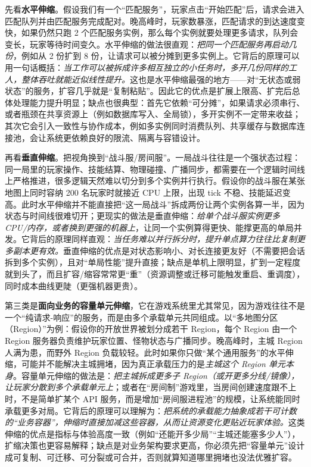 先看\textbf{水平伸缩}。假设我们有一个“匹配服务”，玩家点击“开始匹配”后，请求会进入匹配队列并由匹配服务完成配对。晚高峰时，玩家数暴涨，匹配请求的到达速度变快，如果仍然只跑 2 个匹配服务实例，那么每个实例就要处理更多请求，队列会变长，玩家等待时间变久。水平伸缩的做法很直观：\emph{把同一个匹配服务再启动几份}，例如从 2 份扩到 8 份，让请求可以被分摊到更多实例上。它背后的原理可以用一句话概括：\emph{当工作可以被拆成许多相互独立的小任务时，多开几份同样的工人，整体吞吐就能近似线性提升。}这也是水平伸缩最强的地方——对“无状态或弱状态”的服务，扩容几乎就是“复制粘贴”。因此它的优点是扩展上限高、扩完后总体处理能力提升明显；缺点也很典型：首先它依赖“可分摊”，如果请求必须串行、或者瓶颈在共享资源上（例如数据库写入、全局锁），多开实例不一定带来收益；其次它会引入一致性与协作成本，例如多实例同时消费队列、共享缓存与数据库连接池，会让系统更依赖良好的限流、隔离与容错设计。

再看\textbf{垂直伸缩}。把视角换到“战斗服/房间服”。一局战斗往往是一个强状态过程：同一局里的玩家操作、技能结算、物理碰撞、广播同步，都需要在一个逻辑时间线上严格推进，很多逻辑天然难以切分到多个实例并行执行。假设你的战斗服在某张地图上同时容纳 200 名玩家时就接近 CPU 上限，出现 tick 不稳、技能延迟变高。此时水平伸缩并不能直接把“这一局战斗”拆成两份让两个实例各算一半，因为状态与时间线很难切开；更现实的做法是垂直伸缩：\emph{给单个战斗服实例更多 CPU/内存，或者换到更强的机器上}，让同一个实例算得更快、能撑更高的单局并发。它背后的原理同样直观：\emph{当任务难以并行拆分时，提升单点算力往往比复制更多副本更有效。}垂直伸缩的优点是对状态影响小、对长连接更友好（不需要把会话拆到多个实例），且对“单局性能”提升直接；缺点是单机上限明显，扩到一定程度就到头了，而且扩容/缩容常常更“重”（资源调整或迁移可能触发重启、重调度），同时成本曲线更陡（更强机器更贵）。

第三类是\textbf{面向业务的容量单元伸缩}，它在游戏系统里尤其常见，因为游戏往往不是一个“纯请求-响应”的服务，而是由多个承载单元共同组成。以“多地图分区（Region）”为例：假设你的开放世界被划分成若干 Region，每个 Region 由一个 Region 服务器负责维护玩家位置、怪物状态与广播同步。晚高峰时，主城 Region 人满为患，而野外 Region 负载较轻。此时如果你只做“某个通用服务”的水平伸缩，可能并不能解决主城拥堵，因为真正承载压力的是\emph{主城这个 Region 单元本身}。容量单元伸缩的做法是：\emph{把主城拆成更多子 Region（或开更多分线/镜像），让玩家分散到多个承载单元上}；或者在“房间制”游戏里，当房间创建速度跟不上时，不是简单扩某个 API 服务，而是增加“房间服进程池”的规模，让系统能同时承载更多对局。它背后的原理可以理解为：\emph{把系统的承载能力抽象成若干可计数的“业务容器”，伸缩时直接加减这些容器，从而让资源变化更贴近玩家体验。}这类伸缩的优点是指标与体验高度一致（例如“还能开多少局”“主城还能塞多少人”），扩缩决策也更容易解释；缺点是对业务架构要求更高，你必须先把“容量单元”设计成可复制、可迁移、可分裂或可合并，否则就算知道哪里拥堵也没法优雅扩容。

